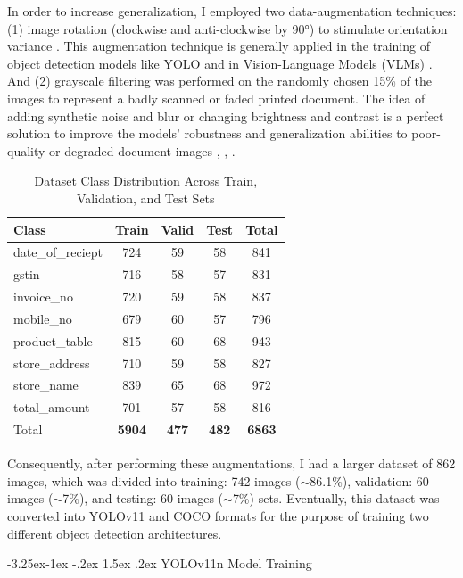 \documentclass[conference,twocolumn]{IEEEtran}
\makeatletter
\renewcommand{\subsection}{\@startsection{subsection}{2}{\z@}%
  {-3.25ex\@plus -1ex \@minus -.2ex}%
  {1.5ex \@plus .2ex}%
  {\normalfont\normalsize\bfseries\itshape}}
\makeatother
\begin{document}
In order to increase generalization, I employed two data-augmentation
techniques: (1) image rotation (clockwise and anti-clockwise by 90°) to
stimulate orientation variance \cite{ref8}. This augmentation technique is
generally applied in the training of object detection models like YOLO
and in Vision-Language Models (VLMs) \cite{ref15}. And (2) grayscale
filtering was performed on the randomly chosen 15\% of the images to
represent a badly scanned or faded printed document. The idea of adding
synthetic noise and blur or changing brightness and contrast is a
perfect solution to improve the models' robustness and
generalization abilities to poor-quality or degraded document images
\cite{ref3}, \cite{ref5}, \cite{ref6}.

\begin{table}[htbp]
\caption{Dataset Class Distribution Across Train, Validation, and Test Sets}
\label{tab:dataset}
\centering
\footnotesize
\begin{tabular}{lcccc}
\toprule
Class & Train & Valid & Test & Total \\
\midrule
date\_of\_reciept & 724 & 59 & 58 & 841 \\
gstin & 716 & 58 & 57 & 831 \\
invoice\_no & 720 & 59 & 58 & 837 \\
mobile\_no & 679 & 60 & 57 & 796 \\
product\_table & 815 & 60 & 68 & 943 \\
store\_address & 710 & 59 & 58 & 827 \\
store\_name & 839 & 65 & 68 & 972 \\
total\_amount & 701 & 57 & 58 & 816 \\
\midrule
Total & \textbf{5904} & \textbf{477} & \textbf{482} & \textbf{6863} \\
\bottomrule
\end{tabular}
\end{table}

Consequently, after performing these augmentations, I had a larger
dataset of 862 images, which was divided into training: 742 images
($\sim$86.1\%), validation: 60 images ($\sim$7\%), and testing: 60 images ($\sim$7\%)
sets. Eventually, this dataset was converted into YOLOv11 and COCO
formats for the purpose of training two different object detection
architectures.

\subsection{YOLOv11n Model Training}
\end{document}
